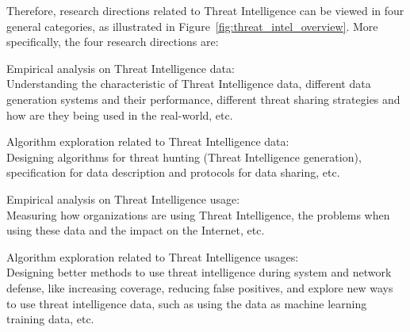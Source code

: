 \begin{dissertationintroduction}
Therefore, research directions related to Threat Intelligence can be 
viewed in four general categories, as illustrated in
Figure~\ref{fig:threat_intel_overview}. More specifically, the four 
research directions are: 
\begin{prettylist}
    \item Empirical analysis on Threat Intelligence data: \\
    Understanding the characteristic of Threat Intelligence data, different
    data generation systems and their performance, different threat sharing
    strategies and how are they being used in the real-world, etc.
    
    \item Algorithm exploration related to Threat Intelligence data: \\
    Designing algorithms for threat hunting (Threat Intelligence generation),
    specification for data description and protocols for data sharing, etc.
    
    \item Empirical analysis on Threat Intelligence usage: \\
    Measuring how organizations are using Threat Intelligence, the problems 
    when using these data and the impact on the Internet, etc.
    
    \item Algorithm exploration related to Threat Intelligence usages: \\
    Designing better methods to use threat intelligence during system and 
    network defense, like increasing coverage, reducing false positives, and
    explore new ways to use threat intelligence data, such as using the 
    data as machine learning training data, etc.
\end{prettylist}


\end{dissertationintroduction}
